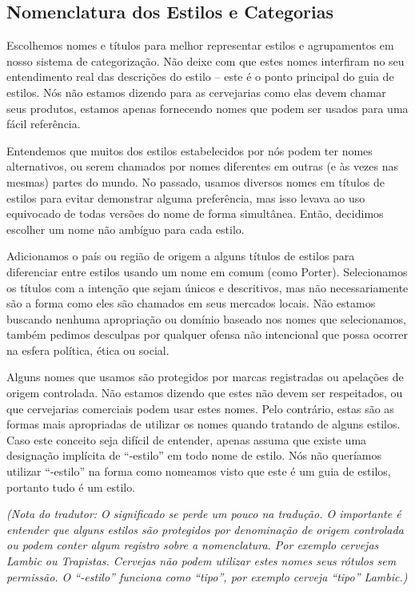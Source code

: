 \subsection*{Nomenclatura dos Estilos e Categorias}

Escolhemos nomes e títulos para melhor representar estilos e agrupamentos em nosso sistema de categorização. Não deixe com que estes nomes interfiram no seu entendimento real das descrições do estilo – este é o ponto principal do guia de estilos. Nós não estamos dizendo para as cervejarias como elas devem chamar seus produtos, estamos apenas fornecendo nomes que podem ser usados para uma fácil referência.

Entendemos que muitos dos estilos estabelecidos por nós podem ter nomes alternativos, ou serem chamados por nomes diferentes em outras (e às vezes nas mesmas) partes do mundo. No passado, usamos diversos nomes em títulos de estilos para evitar demonstrar alguma preferência, mas isso levava ao uso equivocado de todas versões do nome de forma simultânea. Então, decidimos escolher um nome não ambíguo para cada estilo.

Adicionamos o país ou região de origem a alguns títulos de estilos para diferenciar entre estilos usando um nome em comum (como Porter). Selecionamos os títulos com a intenção que sejam únicos e descritivos, mas não necessariamente são a forma como eles são chamados em seus mercados locais. Não estamos buscando nenhuma apropriação ou domínio baseado nos nomes que selecionamos, também pedimos desculpas por qualquer ofensa não intencional que possa ocorrer na esfera política, ética ou social.

Alguns nomes que usamos são protegidos por marcas registradas ou apelações de origem controlada. Não estamos dizendo que estes não devem ser respeitados, ou que cervejarias comerciais podem usar estes nomes. Pelo contrário, estas são as formas mais apropriadas de utilizar os nomes quando tratando de alguns estilos. Caso este conceito seja difícil de entender, apenas assuma que existe uma designação implícita de “-estilo” em todo nome de estilo. Nós não queríamos utilizar “-estilo” na forma como nomeamos visto que este é um guia de estilos, portanto tudo é um estilo.

\textit{(Nota do tradutor: O significado se perde um pouco na tradução. O importante é entender que alguns estilos são protegidos por denominação de origem controlada ou podem conter algum registro sobre a nomenclatura. Por exemplo cervejas Lambic ou Trapistas. Cervejas não podem utilizar estes nomes seus rótulos sem permissão. O “-estilo” funciona como “tipo”, por exemplo cerveja “tipo” Lambic.)}